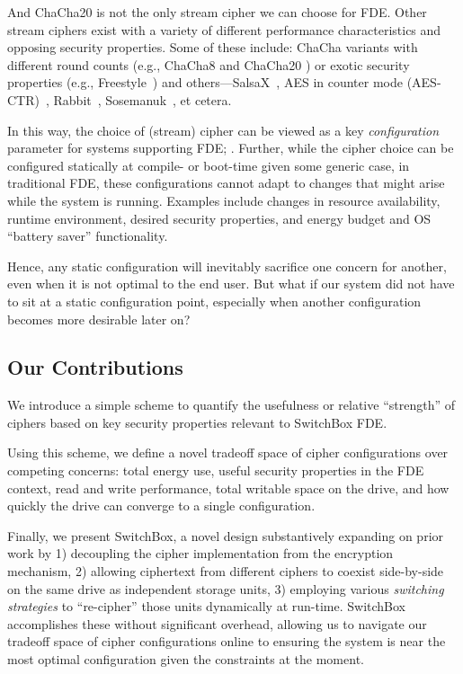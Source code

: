 And ChaCha20 is not the only stream cipher we can choose for FDE. Other stream
ciphers exist with a variety of different performance characteristics and
opposing security properties. Some of these include: ChaCha variants with
different round counts (e.g., ChaCha8 \cite{ChaCha8} and ChaCha20
\cite{ChaCha20}) or exotic security properties (e.g.,
Freestyle~\cite{Freestyle}) and others---SalsaX~\cite{SalsaX}, AES in counter
mode (AES-CTR)~\cite{AES-CTR}, Rabbit~\cite{Rabbit}, Sosemanuk~\cite{Sosemanuk},
et cetera.

In this way, the choice of (stream) cipher can be viewed as a key
\emph{configuration} parameter for systems supporting FDE; . Further, while the cipher choice can be configured
statically at compile- or boot-time given some generic case, in traditional FDE,
these configurations cannot adapt to changes that might arise while the system
is running. Examples include changes in resource availability, runtime
environment, desired security properties, and energy budget and OS ``battery
saver'' functionality.

Hence, any static configuration will inevitably sacrifice one concern for
another, even when it is not optimal to the end user. But what if our system did
not have to sit at a static configuration point, especially when another
configuration becomes more desirable later on?

\subsection{Our Contributions}

We introduce a simple scheme to quantify the usefulness or relative ``strength''
of ciphers based on key security properties relevant to SwitchBox FDE.

Using this scheme, we define a novel tradeoff space of cipher configurations
over competing concerns: total energy use, useful security properties in the FDE
context, read and write performance, total writable space on the drive, and how
quickly the drive can converge to a single configuration.

Finally, we present SwitchBox, a novel design substantively expanding on prior
work by 1) decoupling the cipher implementation from the encryption mechanism,
2) allowing ciphertext from different ciphers to coexist side-by-side on the
same drive as independent storage units, 3) employing various \emph{switching
strategies} to ``re-cipher'' those units dynamically at run-time. SwitchBox
accomplishes these without significant overhead, allowing us to navigate our
tradeoff space of cipher configurations online to ensuring the system is near
the most optimal configuration given the constraints at the moment.


